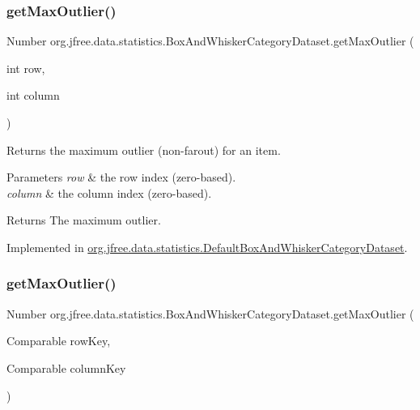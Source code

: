 \subsubsection{\texorpdfstring{get\+Max\+Outlier()}{getMaxOutlier()}\hspace{0.1cm}{\footnotesize\ttfamily [1/2]}}
{\footnotesize\ttfamily Number org.\+jfree.\+data.\+statistics.\+Box\+And\+Whisker\+Category\+Dataset.\+get\+Max\+Outlier (\begin{DoxyParamCaption}\item[{int}]{row,  }\item[{int}]{column }\end{DoxyParamCaption})}

Returns the maximum outlier (non-\/farout) for an item.


\begin{DoxyParams}{Parameters}
{\em row} & the row index (zero-\/based). \\
\hline
{\em column} & the column index (zero-\/based).\\
\hline
\end{DoxyParams}
\begin{DoxyReturn}{Returns}
The maximum outlier. 
\end{DoxyReturn}


Implemented in \mbox{\hyperlink{classorg_1_1jfree_1_1data_1_1statistics_1_1_default_box_and_whisker_category_dataset_aa21c2cd039abf342549c19731543eea5}{org.\+jfree.\+data.\+statistics.\+Default\+Box\+And\+Whisker\+Category\+Dataset}}.

\mbox{\label{interfaceorg_1_1jfree_1_1data_1_1statistics_1_1_box_and_whisker_category_dataset_a72450d83de5ee798edf42bda87232f1d}} 
\subsubsection{\texorpdfstring{get\+Max\+Outlier()}{getMaxOutlier()}\hspace{0.1cm}{\footnotesize\ttfamily [2/2]}}
{\footnotesize\ttfamily Number org.\+jfree.\+data.\+statistics.\+Box\+And\+Whisker\+Category\+Dataset.\+get\+Max\+Outlier (\begin{DoxyParamCaption}\item[{Comparable}]{row\+Key,  }\item[{Comparable}]{column\+Key }\end{DoxyParamCaption})}

